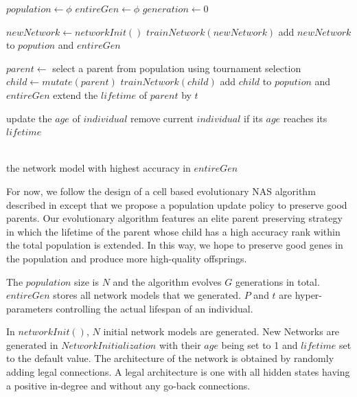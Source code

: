 \documentclass{article}
\begin{document}
\begin{normalsize}
\begin{algorithm}[H]
\begin{algorithmic}[1]
     \State $population\gets \phi$
     \State $entireGen\gets \phi$
     \State $generation\gets 0$
     
     \State $newNetwork\gets networkInit()$
     \State $trainNetwork(newNetwork)$
     \State add $newNetwork$ to $popution$ and $entireGen$
     \EndWhile
     
   
     
       \State $parent\gets$ select a parent from population using tournament selection 
       \State $child \gets mutate(parent)$
       \State $trainNetwork(child)$
       \State add $child$ to $popution$ and $entireGen$
         \State extend the $lifetime$ of $parent$ by $t$
       \EndIf
       
         \State update the $age$ of $individual$
         \State remove current $individual$ if its $ age $ reaches its $lifetime$
       \EndFor
       
       
     \EndWhile
     
     
     \\  
     \Return the network model with highest accuracy in $entireGen$
  
   \end{algorithmic}  
   \end{algorithm}  
   For now, we follow the design of a cell based evolutionary NAS algorithm described in\cite{DBLP:journals/corr/abs-1802-01548} except that we propose a population update policy to preserve good parents. 
   Our evolutionary algorithm features an elite parent preserving strategy in which the lifetime of the parent whose child has a high accuracy rank within the total population is extended. In this way, we hope to preserve good genes in the population and produce more high-quality offsprings.
 
 The $population$ size is $N$ and the algorithm evolves $G$ generations in total. $entireGen$ stores all network models that we generated. $P$ and $t$ are hyper-parameters controlling the actual lifespan of an individual.
      
 In $networkInit()$, $N$ initial network models are generated. New Networks are generated in $Network Initialization$ with their $age $ being set to 1 and $lifetime$ set to the default value. The architecture of the network is obtained by randomly adding legal connections. A legal architecture is one with all hidden states having a positive in-degree and without any go-back connections. 
   

\end{normalsize}
\end{document}
